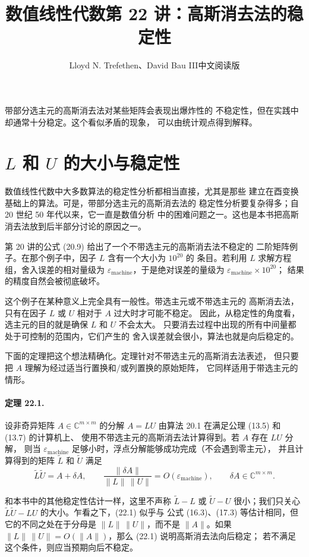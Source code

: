 \documentclass[UTF8,fontset=none,12pt]{ctexart}
\title{数值线性代数\quad 第 22 讲：高斯消去法的稳定性}
\author{Lloyd N. Trefethen、David Bau III\quad 中文阅读版}
\date{}
\newcommand{\epsmach}{\varepsilon_{\mathrm{machine}}}
\begin{document}
\maketitle
\pagestyle{plain}

带部分选主元的高斯消去法对某些矩阵会表现出爆炸性的
不稳定性，但在实践中却通常十分稳定。这个看似矛盾的现象，
可以由统计观点得到解释。

\section*{$L$ 和 $U$ 的大小与稳定性}

数值线性代数中大多数算法的稳定性分析都相当直接，尤其是那些
建立在酉变换基础上的算法。可是，带部分选主元的高斯消去法的
稳定性分析要复杂得多；自 20 世纪 50 年代以来，它一直是数值分析
中的困难问题之一。这也是本书把高斯消去法放到后半部分讨论的原因之一。

第 20 讲的公式 (20.9) 给出了一个不带选主元的高斯消去法不稳定的
二阶矩阵例子。在那个例子中，因子 $L$ 含有一个大小为 $10^{20}$ 的
条目。若利用 $L$ 求解方程组，舍入误差的相对量级为
$\epsmach$，于是绝对误差的量级为 $\epsmach\times 10^{20}$；
结果的精度自然会被彻底破坏。

这个例子在某种意义上完全具有一般性。带选主元或不带选主元的
高斯消去法，只有在因子 $L$ 或 $U$ 相对于 $A$ 过大时才可能不稳定。
因此，从稳定性的角度看，选主元的目的就是确保 $L$ 和 $U$ 不会太大。
只要消去过程中出现的所有中间量都处于可控制的范围内，它们产生的
舍入误差就会很小，算法也就是向后稳定的。

下面的定理把这个想法精确化。定理针对不带选主元的高斯消去法表述，
但只要把 $A$ 理解为经过适当行置换和/或列置换的原始矩阵，
它同样适用于带选主元的情形。

\paragraph{定理 22.1.}
设非奇异矩阵 $A\in\mathbb{C}^{m\times m}$ 的分解
$A=LU$ 由算法 20.1 在满足公理 (13.5) 和 (13.7) 的计算机上、
使用不带选主元的高斯消去法计算得到。若 $A$ 存在 $LU$ 分解，
则当 $\epsmach$ 足够小时，浮点分解能够成功完成（不会遇到零主元），
并且计算得到的矩阵 $\widetilde L$ 和 $\widetilde U$ 满足
\begin{equation}
 \widetilde L\widetilde U=A+\delta A,\qquad
 \frac{\|\delta A\|}{\|L\|\,\|U\|}=O(\epsmach),
 \qquad \delta A\in\mathbb{C}^{m\times m}.
 \tag{22.1}
\end{equation}

和本书中的其他稳定性估计一样，这里不声称
$\widetilde L-L$ 或 $\widetilde U-U$ 很小；我们只关心
$\widetilde L\widetilde U-LU$ 的大小。乍看之下，(22.1) 似乎与
公式 (16.3)、(17.3) 等估计相同，但它的不同之处在于分母是
$\|L\|\,\|U\|$，而不是 $\|A\|$。如果
$\|L\|\,\|U\|=O(\|A\|)$，那么 (22.1) 说明高斯消去法向后稳定；
若不满足这个条件，则应当预期向后不稳定。
\end{document}
